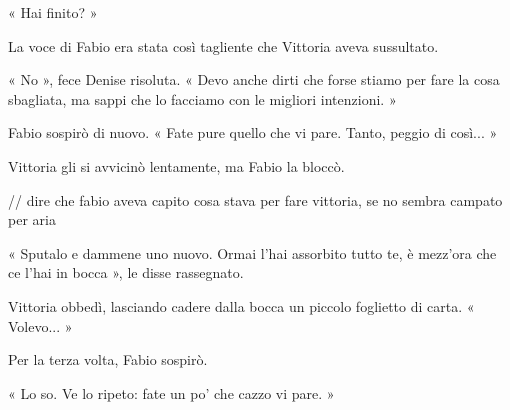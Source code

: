 « Hai finito? »

La voce di Fabio era stata così tagliente che Vittoria aveva sussultato.

« No », fece Denise risoluta. « Devo anche dirti che forse stiamo per fare la cosa sbagliata, ma sappi che lo facciamo con le migliori intenzioni. »

Fabio sospirò di nuovo. « Fate pure quello che vi pare. Tanto, peggio di così... »

Vittoria gli si avvicinò lentamente, ma Fabio la bloccò.

// dire che fabio aveva capito cosa stava per fare vittoria, se no sembra campato per aria

« Sputalo e dammene uno nuovo. Ormai l'hai assorbito tutto te, è mezz'ora che ce l'hai in bocca », le disse rassegnato.

Vittoria obbedì, lasciando cadere dalla bocca un piccolo foglietto di carta. « Volevo... »

Per la terza volta, Fabio sospirò.

« Lo so. Ve lo ripeto: fate un po' che cazzo vi pare. »
